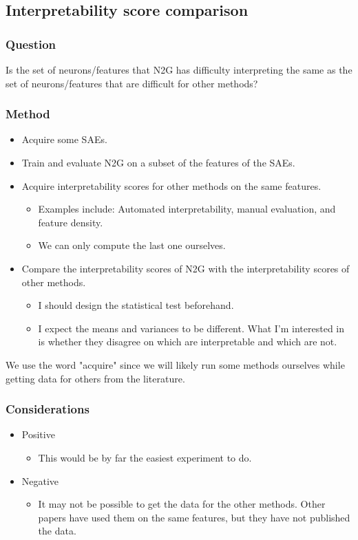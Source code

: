 \documentclass[../main.tex]{subfiles}
\begin{document}
\subsection{Interpretability score comparison}
\subsubsection{Question}
Is the set of neurons/features that N2G has difficulty interpreting the same as the set of neurons/features that are difficult for other methods?

\subsubsection{Method}
\begin{itemize}
    \item Acquire some SAEs.
    \item Train and evaluate N2G on a subset of the features of the SAEs.
    \item Acquire interpretability scores for other methods on the same features.
    \begin{itemize}
        \item Examples include: Automated interpretability, manual evaluation, and feature density.
        \item We can only compute the last one ourselves.
    \end{itemize}
    \item Compare the interpretability scores of N2G with the interpretability scores of other methods.
    \begin{itemize}
        \item I should design the statistical test beforehand.
        \item I expect the means and variances to be different.
        What I'm interested in is whether they disagree on which are interpretable and which are not.
    \end{itemize}
\end{itemize}
We use the word "acquire" since we will likely run some methods ourselves while getting data for others from the literature.

\subsubsection{Considerations}
\begin{itemize}
    \item Positive
    \begin{itemize}
        \item This would be by far the easiest experiment to do.
    \end{itemize}
    \item Negative
    \begin{itemize}
        \item It may not be possible to get the data for the other methods. Other papers have used them on the same features, but they have not published the data.
    \end{itemize}
\end{itemize}
\end{document}
